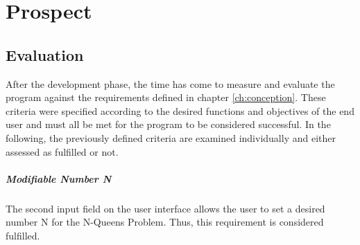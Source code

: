 
\chapter{Prospect}
\section{Evaluation}
After the development phase, the time has come to measure and evaluate the program against the requirements defined in chapter \ref{ch:conception}. These criteria were specified according to the desired functions and objectives of the end user and must all be met for the program to be considered successful. In the following, the previously defined criteria are examined individually and either assessed as fulfilled or not.
\paragraph{Modifiable Number N}
The second input field on the user interface allows the user to set a desired number N for the N-Queens Problem. Thus, this requirement is considered fulfilled.
